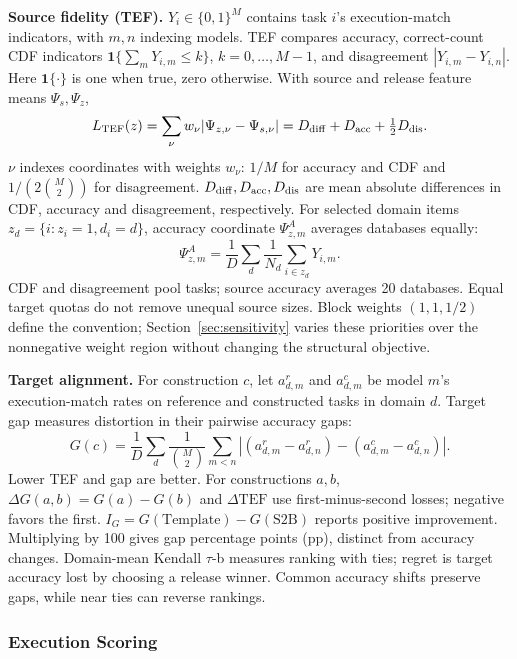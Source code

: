 \textbf{Source fidelity (TEF).} $Y_i\in\{0,1\}^M$ contains task $i$'s execution-match indicators, with $m,n$ indexing models. TEF compares accuracy, correct-count CDF indicators $\mathbf1\{\sum_mY_{i,m}\le k\}$, $k=0,\ldots,M-1$, and disagreement $|Y_{i,m}-Y_{i,n}|$. Here $\mathbf1\{\cdot\}$ is one when true, zero otherwise. With source and release feature means $\Psi_s,\Psi_z$,
\begin{equation}
 L_{\mathrm{TEF}}(z)=\sum_\nu w_\nu|\Psi_{z,\nu}-\Psi_{s,\nu}|
 =D_{\rm diff}+D_{\rm acc}+\tfrac12D_{\rm dis}.
 \label{eq:tef}
\end{equation}
$\nu$ indexes coordinates with weights $w_\nu$: $1/M$ for accuracy and CDF and $1/(2\binom M2)$ for disagreement. $D_{\rm diff},D_{\rm acc},D_{\rm dis}$ are mean absolute differences in CDF, accuracy and disagreement, respectively. For selected domain items $z_d=\{i:z_i=1,d_i=d\}$, accuracy coordinate $\Psi^A_{z,m}$ averages databases equally:
\begin{equation}
 \Psi^A_{z,m}=\frac1D\sum_d\frac1{N_d}\sum_{i\in z_d}Y_{i,m}.
\end{equation}
CDF and disagreement pool tasks; source accuracy averages 20 databases. Equal target quotas do not remove unequal source sizes. Block weights $(1,1,1/2)$ define the convention; Section~\ref{sec:sensitivity} varies these priorities over the nonnegative weight region without changing the structural objective.

\textbf{Target alignment.} For construction $c$, let $a^r_{d,m}$ and $a^c_{d,m}$ be model $m$'s execution-match rates on reference and constructed tasks in domain $d$. Target gap measures distortion in their pairwise accuracy gaps:
\begin{equation}
 G(c)=\frac1D\sum_d\frac1{\binom M2}\sum_{m<n}
 \left|(a^r_{d,m}-a^r_{d,n})-(a^c_{d,m}-a^c_{d,n})\right|.
 \label{eq:gap}
\end{equation}
Lower TEF and gap are better. For constructions $a,b$, $\Delta G(a,b)=G(a)-G(b)$ and $\Delta\mathrm{TEF}$ use first-minus-second losses; negative favors the first. $I_G=G(\mathrm{Template})-G(\mathrm{S2B})$ reports positive improvement. Multiplying by 100 gives gap percentage points (pp), distinct from accuracy changes. Domain-mean Kendall $\tau$-b measures ranking with ties; regret is target accuracy lost by choosing a release winner. Common accuracy shifts preserve gaps, while near ties can reverse rankings.


\subsubsection{Execution Scoring}\label{sec:scoring}

